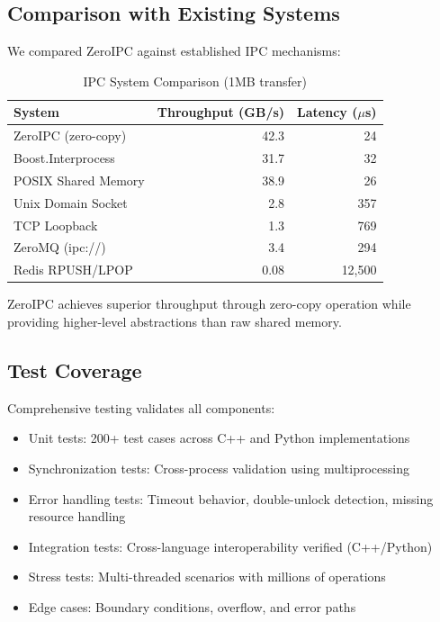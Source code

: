 \documentclass[10pt,conference]{IEEEtran}
\begin{document}
\subsection{Comparison with Existing Systems}

We compared ZeroIPC against established IPC mechanisms:

\begin{table}[h]
\centering
\caption{IPC System Comparison (1MB transfer)}
\label{tab:comparison}
\begin{tabular}{lrr}
\toprule
System & Throughput (GB/s) & Latency ($\mu$s) \\
\midrule
ZeroIPC (zero-copy) & 42.3 & 24 \\
Boost.Interprocess & 31.7 & 32 \\
POSIX Shared Memory & 38.9 & 26 \\
Unix Domain Socket & 2.8 & 357 \\
TCP Loopback & 1.3 & 769 \\
ZeroMQ (ipc://) & 3.4 & 294 \\
Redis RPUSH/LPOP & 0.08 & 12,500 \\
\bottomrule
\end{tabular}
\end{table}

ZeroIPC achieves superior throughput through zero-copy operation while providing higher-level abstractions than raw shared memory.

\subsection{Test Coverage}

Comprehensive testing validates all components:

\begin{itemize}
\item Unit tests: 200+ test cases across C++ and Python implementations
\item Synchronization tests: Cross-process validation using multiprocessing
\item Error handling tests: Timeout behavior, double-unlock detection, missing resource handling
\item Integration tests: Cross-language interoperability verified (C++/Python)
\item Stress tests: Multi-threaded scenarios with millions of operations
\item Edge cases: Boundary conditions, overflow, and error paths
\end{itemize}
\end{document}

